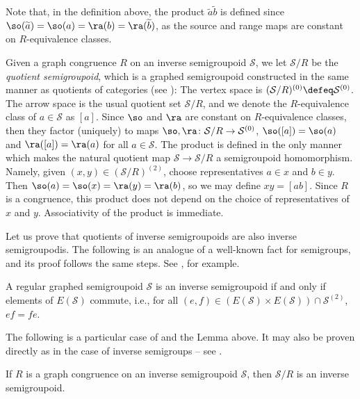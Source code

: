 Note that, in the definition above, the product $\widetilde{a}\widetilde{b}$ is defined since $\so(\widetilde{a})=\so(a)=\ra(b)=\ra(\widetilde{b})$, as the source and range maps are constant on $R$-equivalence classes.

Given a graph congruence $R$ on an inverse semigroupoid $\mathcal{S}$, we let $\mathcal{S}/R$ be the \emph{quotient semigroupoid}, which is a graphed semigroupoid constructed in the same manner as quotients of categories (see \cite[Section 2.8]{MR1712872}): The vertex space is $(\mathcal{S}/R)^{(0)}\defeq\mathcal{S}^{(0)}$. The arrow space is the usual quotient set $\mathcal{S}/R$, and we denote the $R$-equivalence class of $a\in\mathcal{S}$ as $[a]$. Since $\so$ and $\ra$ are constant on $R$-equivalence classes, then they factor (uniquely) to maps $\so,\ra\colon\mathcal{S}/R\to\mathcal{S}^{(0)}$, $\so([a])=\so(a)$ and $\ra([a])=\ra(a)$ for all $a\in\mathcal{S}$. The product is defined in the only manner which makes the natural quotient map $\mathcal{S}\to\mathcal{S}/R$ a semigroupoid homomorphism. Namely, given $(x,y)\in (\mathcal{S}/R)^{(2)}$, choose representatives $a\in x$ and $b\in y$. Then $\so(a)=\so(x)=\ra(y)=\ra(b)$, so we may define $xy=[ab]$. Since $R$ is a congruence, this product does not depend on the choice of representatives of $x$ and $y$. Associativity of the product is immediate.

Let us prove that quotients of inverse semigroupoids are also inverse semigroupodis. The following is an analogue of a well-known fact for semigroups, and its proof follows the same steps. See \cite[Theorem 5.1.1]{MR1455373}, for example.

\begin{lemma}[{\cite[Lemma 3.3.1]{MR3597709}}]\label{lem:regularisinverseiffidempotentscommute}
A regular graphed semigroupoid $\mathcal{S}$ is an inverse semigroupoid if and only if elements of $E(\mathcal{S})$ commute, i.e., for all $(e,f)\in (E(\mathcal{S})\times E(\mathcal{S}))\cap \mathcal{S}^{(2)}$, $ef=fe$.
\end{lemma}

The following is a particular case of \cite[Lemma 3.3.3]{MR3597709} and the Lemma above. It may also be proven directly as in the case of inverse semigroups -- see \cite[Proposition 2.1.1(iii)]{MR1724106}.

\begin{proposition}
If $R$ is a graph congruence on an inverse semigroupoid $\mathcal{S}$, then $\mathcal{S}/R$ is an inverse semigroupoid.
\end{proposition}

